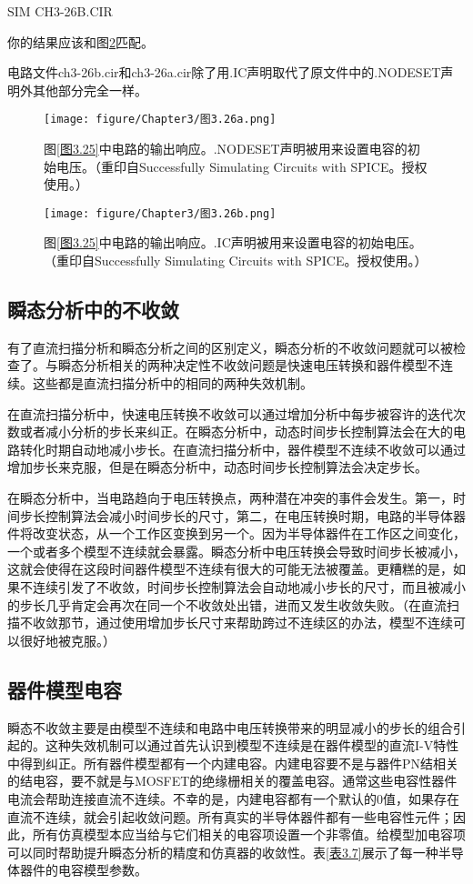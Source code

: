 SIM CH3-26B.CIR

你的结果应该和图\ref{图3.26b}匹配。

电路文件ch3-26b.cir和ch3-26a.cir除了用.IC声明取代了原文件中的.NODESET声明外其他部分完全一样。

\begin{figure}[htbp]
\small
    \centering
    \texttt{[image: figure/Chapter3/图3.26a.png]}
    \caption{图\ref{图3.25}中电路的输出响应。.NODESET声明被用来设置电容的初始电压。（重印自Successfully Simulating Circuits with SPICE。授权使用。）}
    \label{图3.26a}
\end{figure}

\begin{figure}[htbp]
\small
    \centering
    \texttt{[image: figure/Chapter3/图3.26b.png]}
    \caption{图\ref{图3.25}中电路的输出响应。.IC声明被用来设置电容的初始电压。（重印自Successfully Simulating Circuits with SPICE。授权使用。）}
    \label{图3.26b}
\end{figure}

\subsection{瞬态分析中的不收敛}
有了直流扫描分析和瞬态分析之间的区别定义，瞬态分析的不收敛问题就可以被检查了。与瞬态分析相关的两种决定性不收敛问题是快速电压转换和器件模型不连续。这些都是直流扫描分析中的相同的两种失效机制。

在直流扫描分析中，快速电压转换不收敛可以通过增加分析中每步被容许的迭代次数或者减小分析的步长来纠正。在瞬态分析中，动态时间步长控制算法会在大的电路转化时期自动地减小步长。在直流扫描分析中，器件模型不连续不收敛可以通过增加步长来克服，但是在瞬态分析中，动态时间步长控制算法会决定步长。

在瞬态分析中，当电路趋向于电压转换点，两种潜在冲突的事件会发生。第一，时间步长控制算法会减小时间步长的尺寸，第二，在电压转换时期，电路的半导体器件将改变状态，从一个工作区变换到另一个。因为半导体器件在工作区之间变化，一个或者多个模型不连续就会暴露。瞬态分析中电压转换会导致时间步长被减小，这就会使得在这段时间器件模型不连续有很大的可能无法被覆盖。更糟糕的是，如果不连续引发了不收敛，时间步长控制算法会自动地减小步长的尺寸，而且被减小的步长几乎肯定会再次在同一个不收敛处出错，进而又发生收敛失败。（在直流扫描不收敛那节，通过使用增加步长尺寸来帮助跨过不连续区的办法，模型不连续可以很好地被克服。）

\subsection{器件模型电容}
瞬态不收敛主要是由模型不连续和电路中电压转换带来的明显减小的步长的组合引起的。这种失效机制可以通过首先认识到模型不连续是在器件模型的直流I-V特性中得到纠正。所有器件模型都有一个内建电容。内建电容要不是与器件PN结相关的结电容，要不就是与MOSFET的绝缘栅相关的覆盖电容。通常这些电容性器件电流会帮助连接直流不连续。不幸的是，内建电容都有一个默认的0值，如果存在直流不连续，就会引起收敛问题。所有真实的半导体器件都有一些电容性元件；因此，所有仿真模型本应当给与它们相关的电容项设置一个非零值。给模型加电容项可以同时帮助提升瞬态分析的精度和仿真器的收敛性。表\ref{表3.7}展示了每一种半导体器件的电容模型参数。

